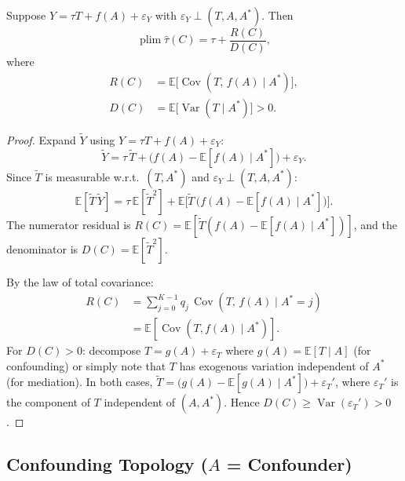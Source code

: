 \begin{lemma}
\label{lem:bias_decomp}
Suppose $Y = \tau T + f(A) + \varepsilon_Y$ with $\varepsilon_Y \perp (T, A, A^*)$.
Then
\begin{equation}
  \operatorname{plim}\hat\tau(C) = \tau + \frac{R(C)}{D(C)},
  \label{eq:bias_decomp}
\end{equation}
where
\begin{align}
  R(C) &= \mathbb{E}\bigl[\operatorname{Cov}(T,\,f(A)\mid A^*)\bigr], \label{eq:R}\\
  D(C) &= \mathbb{E}\bigl[\operatorname{Var}(T\mid A^*)\bigr] > 0. \label{eq:D}
\end{align}
\end{lemma}

\begin{proof}
Expand $\tilde{Y}$ using $Y=\tau T + f(A) + \varepsilon_Y$:
\[
  \tilde{Y} = \tau\,\tilde{T} + \bigl(f(A) - \mathbb{E}[f(A)\mid A^*]\bigr) + \varepsilon_Y.
\]
Since $\tilde{T}$ is measurable w.r.t.\ $(T,A^*)$ and $\varepsilon_Y\perp(T,A,A^*)$:
\[
  \mathbb{E}[\tilde{T}\,\tilde{Y}]
  = \tau\,\mathbb{E}[\tilde{T}^2]
  + \mathbb{E}\bigl[\tilde{T}\,\bigl(f(A)-\mathbb{E}[f(A)\mid A^*]\bigr)\bigr].
\]
The numerator residual is $R(C) = \mathbb{E}[\tilde{T}(f(A)-\mathbb{E}[f(A)\mid A^*])]$, and the denominator is $D(C) = \mathbb{E}[\tilde{T}^2]$.

By the law of total covariance:
\begin{align*}
  R(C) &= \sum_{j=0}^{K-1} q_j\,\operatorname{Cov}(T,\,f(A)\mid A^*{=}j)\\
  &= \mathbb{E}[\operatorname{Cov}(T,f(A)\mid A^*)].
\end{align*}
For $D(C)>0$: decompose $T = g(A) + \varepsilon_T$ where $g(A)=\mathbb{E}[T\mid A]$ (for confounding) or simply note that $T$ has exogenous variation independent of $A^*$ (for mediation).
In both cases, $\tilde{T}=\bigl(g(A)-\mathbb{E}[g(A)\mid A^*]\bigr)+\varepsilon_T'$, where $\varepsilon_T'$ is the component of $T$ independent of $(A,A^*)$.
Hence $D(C)\geq\operatorname{Var}(\varepsilon_T')>0$.
\end{proof}

\subsection{Confounding Topology ($A$ = Confounder)}
\label{app:confounding}

